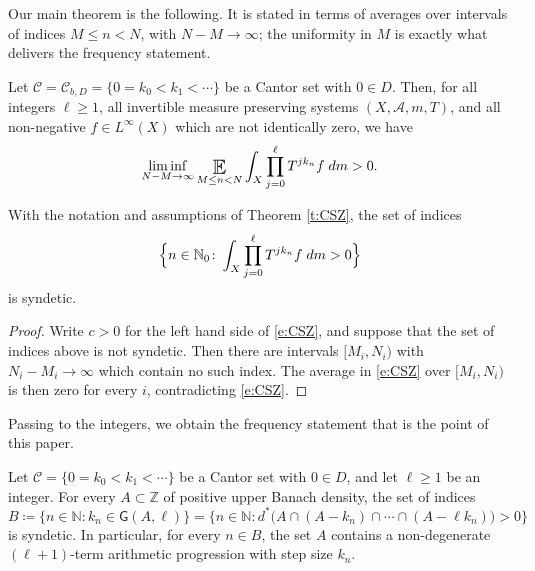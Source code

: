 \smallskip 

Our main theorem is the following.  It is stated in terms of averages over intervals of indices 
$M \leq n < N$, with $N - M \to \infty$; the uniformity in $M$ is exactly what delivers the frequency statement.  

\begin{theorem}  \label{t:CSZ}
    Let $\mathcal C = \mathcal C_{b,D}=\{0=k_0<k_1 < \cdots\}$ be a Cantor set with  $0\in D$.  
    Then, for all integers $\ell \geq 1 $, all  invertible  measure preserving systems $(X,\mathcal A, m, T)$, 
    and  all non-negative  $f \in L ^{\infty}(X)$ which are not identically zero, we have 
    \begin{equation} \label{e:CSZ}
        \liminf_{N-M\to\infty} \Expectation_{M \leq n < N} 
        \int_X \prod_{j=0}^{\ell}  T ^{j k_n} f  \;dm >0. 
    \end{equation}
    \end{theorem}

\begin{corollary} \label{c:syndetic}
    With the notation and assumptions of Theorem \ref{t:CSZ}, the set of indices 
    \begin{equation}
    \Bigl\{ n \in \mathbb N_0 \colon \int_X \prod_{j=0}^{\ell}  T ^{j k_n} f  \;dm >0 \Bigr\} 
    \end{equation}
    is syndetic.  
\end{corollary}

\begin{proof}
    Write $c>0$ for the left hand side of \eqref{e:CSZ}, and suppose that the set of indices above is not syndetic.  
    Then there are intervals $[M_i, N_i)$ with $N_i - M_i \to \infty$ which contain no such index.  
    The average in \eqref{e:CSZ} over $[M_i,N_i)$ is then zero for every $i$, contradicting \eqref{e:CSZ}.  
\end{proof}

Passing to the integers, we obtain the frequency statement that is the point of this paper.  

\begin{theorem}  \label{t:CSZ-Integers}
    Let $\mathcal C =\{0=k_0<k_1 < \cdots\}$ be a Cantor set with $0\in D$, and let $\ell \geq 1$ be an integer.  
    For every $A \subset \mathbb Z$ of positive upper Banach density, the set of indices 
    \begin{equation} \label{e:B}
        B \coloneqq \{ n \in \mathbb N \colon k_n \in \mathsf G (A, \ell ) \} 
        = \bigl\{ n \in \mathbb N \colon d ^{\ast} \bigl( A \cap (A-k_n) \cap \cdots \cap (A - \ell k_n) \bigr) >0 \bigr\} 
    \end{equation}
    is syndetic.  In particular, for every $n \in B$, the set $A$ contains a non-degenerate $(\ell +1)$-term arithmetic progression with step size $k_n$.  
    \end{theorem}


